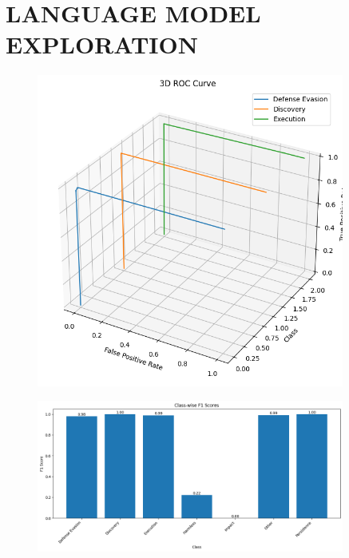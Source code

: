 
\section{LANGUAGE MODEL EXPLORATION}

    
    \begin{figure}[H]
        \centering
        \includegraphics[width=0.9\textwidth]{../figures/plots/section4/3d_roc_curve.png}
        \caption{}
        \label{fig:}
    \end{figure}
    
    \begin{figure}[H]
        \centering
        \includegraphics[width=0.9\textwidth]{../figures/plots/section4/f1_scores.png}
        \caption{}
        \label{fig:}
    \end{figure}
    
